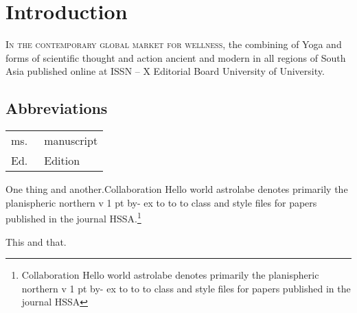 \documentclass{hssa}
\begin{document}
    


\section*{Introduction}

\lettrine[loversize=.1] {I}{n the contemporary global market for
    wellness}, the combining of Yoga and forms of scientific thought and
action  ancient and modern in all regions of South Asia  published online
at ISSN -- X Editorial Board  University of
University.


\begin{small}
    
\section*{Abbreviations}

\begin{longtable}{ll}
ms.\ &manuscript\\
Ed.\ &Edition\\
\end{longtable}

\nocite{*}

One thing and another.Collaboration Hello world astrolabe denotes
primarily the planispheric northern v    1 pt         by- ex to to to
class and style files for papers published in the journal
HSSA.\footnote{Collaboration Hello world astrolabe denotes primarily the
    planispheric northern v    1 pt         by- ex to to to class and style
    files for papers published in the journal HSSA }

\newpage

This and that.

    
\printshorthands
[title=Acronyms,
notkeyword=edition,  %
]

\printshorthands 
[title=Text Editions, 
prenote=blurb01,
keyword=edition, %
sorting=special,
]

\printindex[manuscripts]

\printbibliography 
[title=Secondary Literature,
sorting=nyt,
notkeyword=edition] %

\end{small}
\end{document}
